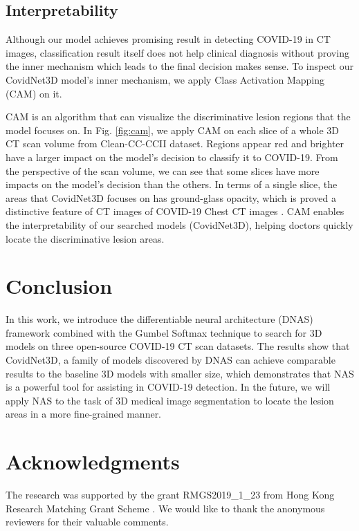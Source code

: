 \documentclass[letterpaper]{article}
\begin{document}
\subsection{Interpretability}
Although our model achieves promising result in detecting COVID-19 in CT images, classification result itself does not help clinical diagnosis without proving the inner mechanism which leads to the final decision makes sense. To inspect our CovidNet3D model's inner mechanism, we apply Class Activation Mapping (CAM) \cite{cam} on it.

CAM is an algorithm that can visualize the discriminative lesion regions that the model focuses on. In Fig. \ref{fig:cam}, we apply CAM on each slice of a whole 3D CT scan volume from Clean-CC-CCII dataset. Regions appear red and brighter have a larger impact on the model's decision to classify it to COVID-19. From the perspective of the scan volume, we can see that some slices have more impacts on the model's decision than the others. In terms of a single slice, the areas that CovidNet3D focuses on has ground-glass opacity, which is proved a distinctive feature of CT images of COVID-19 Chest CT images \cite{radio-chestCT}. CAM enables the interpretability of our searched models (CovidNet3D), helping doctors quickly locate the discriminative lesion areas.








% 






\section{Conclusion}

In this work, we introduce the differentiable neural architecture (DNAS) framework combined with the Gumbel Softmax technique to search for 3D models on three open-source COVID-19 CT scan datasets. The results show that CovidNet3D, a family of models discovered by DNAS can achieve comparable results to the baseline 3D models with smaller size, which demonstrates that NAS is a powerful tool for assisting in COVID-19 detection. In the future, we will apply NAS to the task of 3D medical image segmentation to locate the lesion areas in a more fine-grained manner. 

\section{Acknowledgments}

The research was supported by the grant {RMGS2019\_1\_23} from Hong Kong Research Matching Grant Scheme . We would like to thank the anonymous reviewers for their valuable comments.


% 
% 




\end{document}
